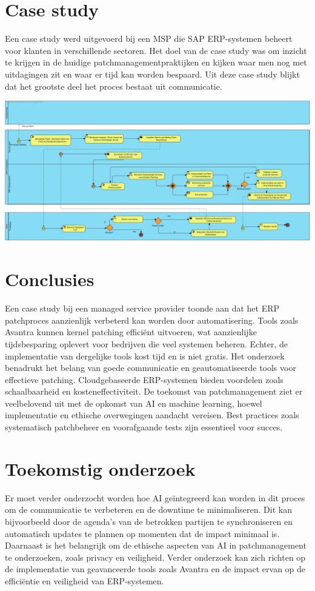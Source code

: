 \documentclass[a0,portrait]{hogent-poster}
\begin{document}
\begin{multicols}{2}
\section{Case study}
Een case study werd uitgevoerd bij een MSP die SAP ERP-systemen beheert voor klanten in verschillende sectoren. Het doel van de case study was om inzicht te krijgen in de huidige patchmanagementpraktijken en kijken waar men nog met uitdagingen zit en waar er tijd kan worden bespaard. Uit deze case study blijkt dat het grootste deel het proces bestaat uit communicatie. 
\begin{center}
  \captionsetup{type=figure}
  \includegraphics[width=1.0\linewidth]{huidigesituatie.jpg}
\end{center}

\section{Conclusies}
Een case study bij een managed service provider toonde aan dat het ERP patchproces aanzienlijk verbeterd kan worden door automatisering. Tools zoals Avantra kunnen kernel patching efficiënt uitvoeren, wat aanzienlijke tijdsbesparing oplevert voor bedrijven die veel systemen beheren. Echter, de implementatie van dergelijke tools kost tijd en is niet gratis. Het onderzoek benadrukt het belang van goede communicatie en geautomatiseerde tools voor effectieve patching. Cloudgebaseerde ERP-systemen bieden voordelen zoals schaalbaarheid en kosteneffectiviteit. De toekomst van patchmanagement ziet er veelbelovend uit met de opkomst van AI en machine learning, hoewel implementatie en ethische overwegingen aandacht vereisen. Best practices zoals systematisch patchbeheer en voorafgaande tests zijn essentieel voor succes.

\section{Toekomstig onderzoek}
Er moet verder onderzocht worden hoe AI geïntegreerd kan worden in dit proces om de communicatie te verbeteren en de downtime te minimaliseren. Dit kan bijvoorbeeld door de agenda's van de betrokken partijen te synchroniseren en automatisch updates te plannen op momenten dat de impact minimaal is. Daarnaast is het belangrijk om de ethische aspecten van AI in patchmanagement te onderzoeken, zoals privacy en veiligheid. Verder onderzoek kan zich richten op de implementatie van geavanceerde tools zoals Avantra en de impact ervan op de efficiëntie en veiligheid van ERP-systemen.


\end{multicols}
\end{document}
